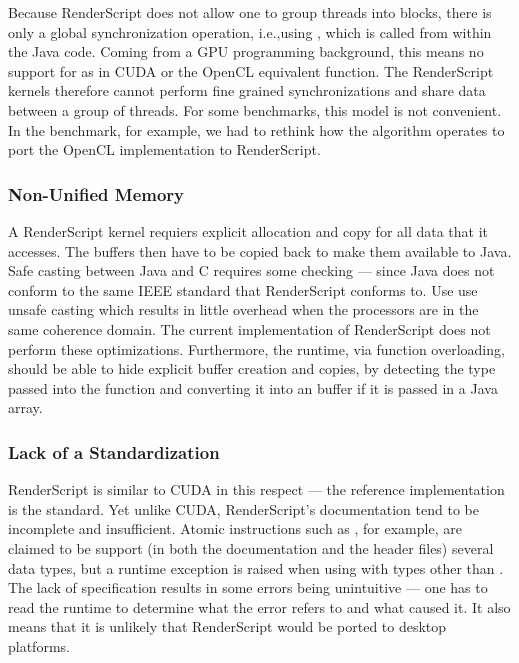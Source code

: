 Because RenderScript does not allow one to group threads into blocks, there is
only a global synchronization operation, i.e.,using ,  which is
called from within the Java code.  Coming from a GPU programming background,
this means no support for  as in CUDA or the OpenCL
equivalent  function.  The RenderScript kernels therefore cannot
perform fine grained synchronizations and share data between a group of threads.
For some benchmarks, this model is not convenient.  In the 
benchmark, for example, we had to rethink how the algorithm operates to port the
OpenCL implementation to RenderScript.


\subsubsection{Non-Unified Memory}

A RenderScript kernel requiers explicit allocation and copy for all data that it accesses. The buffers then have to be copied back to
make them available to Java.  Safe casting between Java and C requires some
checking --- since Java does not conform to the same IEEE standard that
RenderScript conforms to.  Use use unsafe casting which results in little overhead when the processors are in the same coherence domain.  The current
implementation of RenderScript does not perform these optimizations.
Furthermore, the runtime, via function overloading, should be able to hide
explicit buffer creation and copies, by detecting the type passed into the
function and converting it into an  buffer if it is passed in a Java
array.

\subsubsection{Lack of a Standardization}

RenderScript is similar to CUDA in this respect --- the reference implementation
  is the standard.
Yet unlike CUDA, RenderScript's documentation tend to be incomplete and insufficient.
Atomic instructions such as , for example, are claimed to be support 
(in both the documentation and the header files) several data types, but a 
runtime exception is raised when using with types other than .
The lack of specification results in some errors being unintuitive --- one has to 
  read the runtime to determine what the error refers to and what caused it.
It also means that it is unlikely that RenderScript would be 
  ported to desktop platforms.


